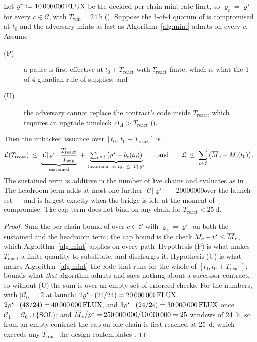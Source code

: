 \begin{property}
\label{prop:worst-case}
Let $\varrho^\star \vcentcolon= \num{10000000}\,\mathrm{FLUX}$ be the decided per-chain mint rate limit, so
$\varrho_c = \varrho^\star$ for every $c \in \mathcal{C}$, with
$T_{\mathrm{win}} = \SI{24}{\hour}$ (). Suppose the 3-of-4 quorum of
 is compromised at $t_0$ and the adversary mints as fast as
Algorithm~\ref{alg:mint} admits on every $c$. Assume
\begin{description}
\item[(P)] a pause is first effective at $t_0 + T_{\mathrm{react}}$ with $T_{\mathrm{react}}$ finite,
  which is what the 1-of-4 guardian rule of  supplies; and
\item[(U)] the adversary cannot replace the contract's code inside $T_{\mathrm{react}}$, which
  requires an upgrade timelock $\Delta_A > T_{\mathrm{react}}$ ().
\end{description}
Then the unbacked issuance over $[t_0,\, t_0 + T_{\mathrm{react}}]$ is
\[
\mathcal{L}(T_{\mathrm{react}})
\;\le\;
\underbrace{|\mathcal{C}|\,\varrho^\star \cdot \frac{T_{\mathrm{react}}}{T_{\mathrm{win}}}}_{\text{sustained}}
\;+\;
\underbrace{\textstyle\sum_{c \in \mathcal{C}}\big(\varrho^\star - b_c(t_0)\big)}_{\text{headroom at } t_0,\ \le\ |\mathcal{C}|\,\varrho^\star}
\qquad\text{and}\qquad
\mathcal{L} \;\le\; \sum_{c \in \mathcal{C}}\big(\bcap{c} - M_c(t_0)\big).
\]
The sustained term is additive in the number of live chains and evaluates as in
. The headroom term adds at most one further $|\mathcal{C}|\,\varrho^\star$ ---
\num{20000000}\flux over the launch set --- and is largest exactly when the bridge is idle at the
moment of compromise. The cap term does not bind on any chain for
$T_{\mathrm{react}} < \SI{25}{\day}$. \planned
\end{property}

\begin{proof}
Sum the per-chain bound of  over $c \in \mathcal{C}$ with
$\varrho_c = \varrho^\star$ on both the sustained and the headroom term; the cap bound is the check
$M_c + v' \le \overline{M}_{c}$, which Algorithm~\ref{alg:mint} applies on every path. Hypothesis (P) is what
makes $T_{\mathrm{react}}$ a finite quantity to substitute, and  discharges it.
Hypothesis (U) is what makes Algorithm~\ref{alg:mint} the code that runs for the whole of
$[t_0, t_0 + T_{\mathrm{react}}]$;  bounds what \emph{that} algorithm admits
and says nothing about a successor contract, so without (U) the sum is over an empty set of
enforced checks. For the numbers, with $|\mathcal{C}_0| = 2$ at launch:
$2\varrho^\star \cdot (24/24) = \num{20000000}\,\mathrm{FLUX}$, $2\varrho^\star \cdot (48/24) =
\num{40000000}\,\mathrm{FLUX}$, and $3\varrho^\star \cdot (24/24) = \num{30000000}\,\mathrm{FLUX}$ once
$\mathcal{C}_1 = \mathcal{C}_0 \cup \{\mathrm{SOL}\}$; and
$\overline{M}_{c} / \varrho^\star = \num{250000000}/\num{10000000} = 25$ windows of \SI{24}{\hour}, so from
an empty contract the cap on one chain is first reached at \SI{25}{\day}, which exceeds any
$T_{\mathrm{react}}$ the design contemplates \srcinferred.
\end{proof}

